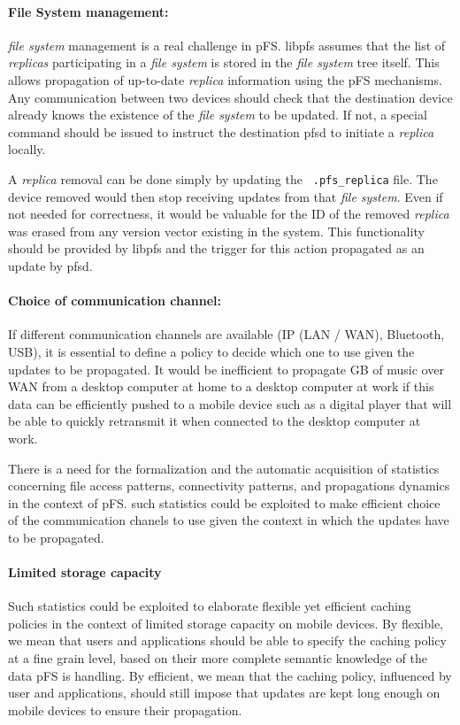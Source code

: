 \paragraph {File System management:}
\emph{file system} management is a real challenge in pFS. libpfs
assumes that the list of \emph{replicas} participating in a \emph{file
  system} is stored in the \emph{file system} tree itself. This allows
propagation of up-to-date \emph{replica} information using the pFS
mechanisms. Any communication between two devices should check that
the destination device already knows the existence of the \emph{file
  system} to be updated. If not, a special command should be issued to
instruct the destination pfsd to initiate a \emph{replica}
locally. 

A \emph{replica} removal can be done simply by updating the {\tt
  .pfs\_replica} file. The device removed would then stop receiving
updates from that \emph{file system}. Even if not needed for
correctness, it would be valuable for the ID of the removed
\emph{replica} was erased from any version vector existing in the
system. This functionality should be provided by libpfs and the
trigger for this action propagated as an update by pfsd.

\paragraph {Choice of communication channel:}
If different communication channels are available (IP (LAN / WAN),
Bluetooth, USB), it is essential to define a policy to decide which
one to use given the updates to be propagated. It would be inefficient
to propagate GB of music over WAN from a desktop computer at home to a
desktop computer at work if this data can be efficiently pushed to a
mobile device such as a digital player that will be able to quickly
retransmit it when connected to the desktop computer at work. 

There is a need for the formalization and the automatic acquisition of
statistics concerning file access patterns, connectivity patterns, and
propagations dynamics in the context of pFS. such statistics could be
exploited to make efficient choice of the communication chanels to
use given the context in which the updates have to be propagated.

\paragraph {Limited storage capacity}
Such statistics could be exploited to elaborate flexible yet efficient
caching policies in the context of limited storage capacity on mobile
devices. By flexible, we mean that users and applications should be
able to specify the caching policy at a fine grain level, based on
their more complete semantic knowledge of the data pFS is handling. By
efficient, we mean that the caching policy, influenced by user and
applications, should still impose that updates are kept long enough on
mobile devices to ensure their propagation.


